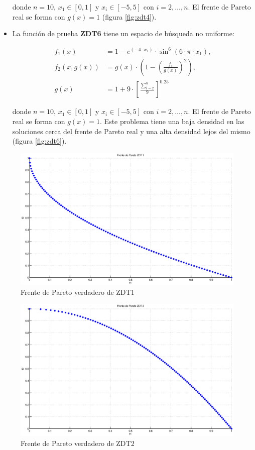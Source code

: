 \begin{itemize}
donde $n=10$, $x_1\in[0,1]$ y $x_i \in[-5,5] $ con $i=2, \ldots, n$. El frente de Pareto real se forma con $g(x)=1$ (figura \ref{fig:zdt4}).

\item La funci\'on de prueba \textbf{ZDT6} tiene un espacio de b\'usqueda no uniforme:

\begin{align*}
f_1(x)&=1- e^{(-4\cdot x_1)} \cdot \sin^6(6\cdot\pi\cdot x_1),\\
f_2(x,g(x))&=g(x)\cdot(1-\left(\frac{f_1}{g(x)}\right)^2),\\
g(x)&=1+9\cdot\left[\frac{\sum_{i=2}^n}{9}\right]^{0.25}
\end{align*}

donde $n=10$, $x_1\in[0,1]$ y $x_i \in[-5,5]$ con $i= 2, \ldots, n$. El frente de Pareto real se forma con $g(x)=1$.
Este problema tiene una baja densidad en las soluciones cerca del frente de Pareto real y una alta densidad lejos del mismo (figura \ref{fig:zdt6}).

\end{itemize}

\begin{figure}
\centering
    \centering
    \includegraphics[scale=0.4]{ApendiceA/paretoZDT1.eps}
    \caption{Frente de Pareto verdadero de ZDT1}
    \label{fig:zdt1}
\end{figure}

\begin{figure}
\centering

    \centering
    \includegraphics[scale=0.4]{ApendiceA/paretoZDT2.eps}
    \caption{Frente de Pareto verdadero de ZDT2}
    \label{fig:zdt2}
\end{figure}

